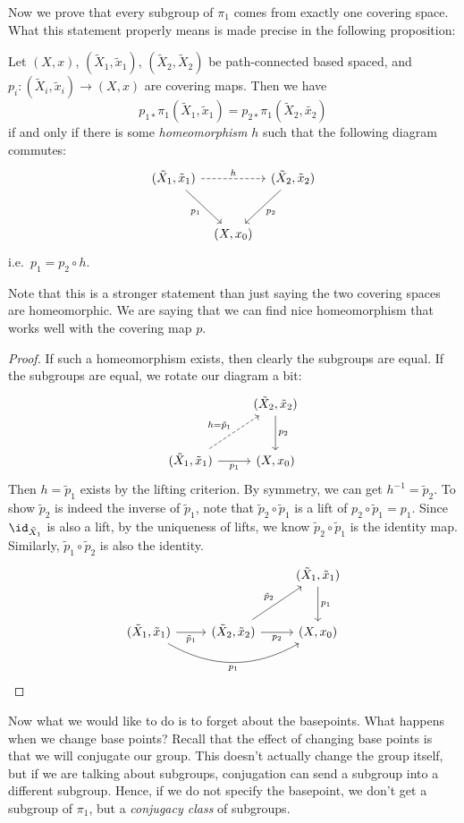 \documentclass[a4paper]{article}
\begin{document}
Now we prove that every subgroup of $\pi_1$ comes from exactly one covering space. What this statement properly means is made precise in the following proposition:
\begin{prop}
  Let $(X, x)$, $(\tilde{X}_1, \tilde{x}_1)$, $(\tilde{X}_2, \tilde{X}_2)$ be path-connected based spaced, and $p_i: (\tilde{X}_i, \tilde{x}_i) \to (X, x)$ are covering maps. Then we have
  \[
    p_{1*}\pi_1(\tilde{X}_1, \tilde{x}_1) = p_{2*} \pi_1(\tilde{X}_2, \tilde{x_2})
  \]
  if and only if there is some \emph{homeomorphism} $h$ such that the following diagram commutes:
  \[
    \begin{tikzcd}[row sep=large, column sep=tiny]
      (\tilde{X}_1, \tilde{x}_1) \ar[rr, dashed, "h"] \ar[rd, "p_1"'] & & (\tilde{X}_2, \tilde{x}_2) \ar[ld, "p_2"]\\
      & (X, x_0)
    \end{tikzcd}
  \]
  i.e.\ $p_1 = p_2 \circ h$.
\end{prop}
Note that this is a stronger statement than just saying the two covering spaces are homeomorphic. We are saying that we can find nice homeomorphism that works well with the covering map $p$.

\begin{proof}
  If such a homeomorphism exists, then clearly the subgroups are equal. If the subgroups are equal, we rotate our diagram a bit:
  \[
    \begin{tikzcd}[row sep=large]
      & (\tilde{X}_2, \tilde{x}_2) \ar[d, "p_2"]\\
      (\tilde{X}_1, \tilde{x}_1) \ar [r, "p_1"'] \ar [ru, dashed, "h = \tilde{p}_1"] & (X, x_0)
    \end{tikzcd}
  \]
  Then $h = \tilde{p}_1$ exists by the lifting criterion. By symmetry, we can get $h^{-1} = \tilde{p}_2$. To show $\tilde{p}_2$ is indeed the inverse of $\tilde{p}_1$, note that $\tilde{p}_2 \circ \tilde{p}_1$ is a lift of $p_2 \circ \tilde{p}_1 = p_1$. Since $\id_{\tilde{X}_1}$ is also a lift, by the uniqueness of lifts, we know $\tilde{p}_2 \circ \tilde{p}_1$ is the identity map. Similarly, $\tilde{p}_1 \circ \tilde{p}_2$ is also the identity.
  \[
    \begin{tikzcd}[row sep=large]
      & & (\tilde{X}_1, \tilde{x}_1) \ar[d, "p_1"]\\
      (\tilde{X}_1, \tilde{x}_1) \ar[rr, bend right, "p_1"'] \ar [r, "\tilde{p}_1"'] & (\tilde{X}_2, \tilde{x}_2) \ar [ru, "\tilde{p}_2"] \ar[r, "p_2"'] & (X, x_0)
    \end{tikzcd}
  \]
\end{proof}
Now what we would like to do is to forget about the basepoints. What happens when we change base points? Recall that the effect of changing base points is that we will conjugate our group. This doesn't actually change the group itself, but if we are talking about subgroups, conjugation can send a subgroup into a different subgroup. Hence, if we do not specify the basepoint, we don't get a subgroup of $\pi_1$, but a \emph{conjugacy class} of subgroups.
\end{document}

